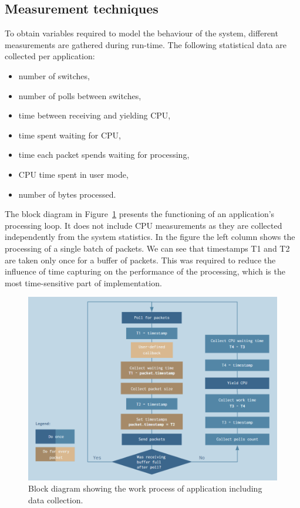 \documentclass[english]{kththesis}
\begin{document}
\subsection{Measurement techniques}
To obtain variables required to model the behaviour of the system, different measurements are gathered during run-time. The following statistical data are collected per application:
\begin{itemize}
    \item number of switches,
    \item number of polls between switches,
    \item time between receiving and yielding CPU,
    \item time spent waiting for CPU,
    \item time each packet spends waiting for processing,
    \item CPU time spent in user mode,
    \item number of bytes processed.
\end{itemize}
The block diagram in Figure~\ref{fig:blockdiagram} presents the functioning of an application's processing loop. It does not include CPU measurements as they are collected independently from the system statistics. In the figure the left column shows the processing of a single batch of packets. We can see that timestamps T1 and T2 are taken only once for a buffer of packets. This was required to reduce the influence of time capturing on the performance of the processing, which is the most time-sensitive part of implementation.

\begin{figure}[!ht]
  \centering
    \includegraphics[width=1\textwidth]{Fig14.png}
  \caption{Block diagram showing the work process of application including data collection.}
  \label{fig:blockdiagram}
\end{figure}
\end{document}
